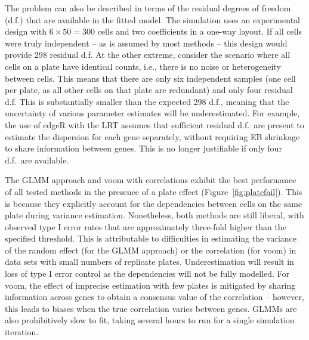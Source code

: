 \documentclass[oupdraft]{bio}
\begin{document}
The problem can also be described in terms of the residual degrees of freedom (d.f.) that are available in the fitted model.
The simulation uses an experimental design with $6 \times 50 =  300$ cells and two coefficients in a one-way layout.
If all cells were truly independent -- as is assumed by most methods -- this design would provide 298 residual d.f. 
At the other extreme, consider the scenario where all cells on a plate have identical counts, i.e., there is no noise or heterogeneity between cells.
This means that there are only six independent samples (one cell per plate, as all other cells on that plate are redundant) and only four residual d.f.
This is substantially smaller than the expected 298 d.f., meaning that the uncertainty of various parameter estimates will be underestimated.
For example, the use of edgeR with the LRT assumes that sufficient residual d.f.\ are present to estimate the dispersion for each gene separately,
    without requiring EB shrinkage to share information between genes.
This is no longer justifiable if only four d.f.\ are available.

The GLMM approach and voom with correlations exhibit the best performance of all tested methods in the presence of a plate effect (Figure~\ref{fig:platefail}).
This is because they explicitly account for the dependencies between cells on the same plate during variance estimation.
Nonetheless, both methods are still liberal, with observed type I error rates that are approximately three-fold higher than the specified threshold.
This is attributable to difficulties in estimating the variance of the random effect (for the GLMM approach) or the correlation (for voom) in data sets with small numbers of replicate plates.
Underestimation will result in loss of type I error control as the dependencies will not be fully modelled.
For voom, the effect of imprecise estimation with few plates is mitigated by sharing information across genes to obtain a consensus value of the correlation -- however, this leads to biases when the true correlation varies between genes.
GLMMs are also prohibitively slow to fit, taking several hours to run for a single simulation iteration.

\end{document}
